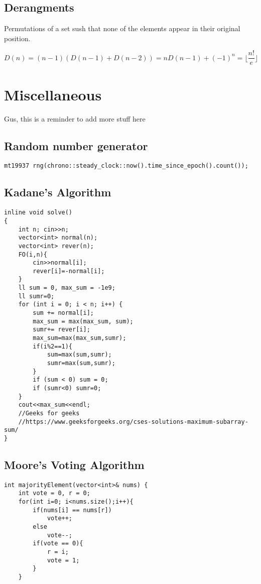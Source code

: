 \documentclass[10pt]{article}
\begin{document}
\begin{multicols*}{2}
\subsection{Derangments}

Permutations of a set sush that none of the elements appear in their original position.

\[
D(n) = (n-1)(D(n-1)+D(n-2)) = nD(n-1)+(-1)^n = \lfloor \frac{n!}{e}\rfloor
\]

\section{Miscellaneous}

Gus, this is a reminder to add more stuff here

\subsection{Random number generator}

\begin{lstlisting}[style=compactcpp]
mt19937 rng(chrono::steady_clock::now().time_since_epoch().count());
\end{lstlisting}

\subsection{Kadane's Algorithm}
\begin{lstlisting}[style=compactcpp]
inline void solve()
{
    int n; cin>>n;
    vector<int> normal(n);
    vector<int> rever(n);
    FO(i,n){
        cin>>normal[i];
        rever[i]=-normal[i];
    }
    ll sum = 0, max_sum = -1e9;
    ll sumr=0;
    for (int i = 0; i < n; i++) {
        sum += normal[i];
        max_sum = max(max_sum, sum);
        sumr+= rever[i];
        max_sum=max(max_sum,sumr);
        if(i%2==1){
            sum=max(sum,sumr);
            sumr=max(sum,sumr);
        }
        if (sum < 0) sum = 0;
        if (sumr<0) sumr=0;
    }
    cout<<max_sum<<endl;
    //Geeks for geeks
    //https://www.geeksforgeeks.org/cses-solutions-maximum-subarray-sum/
}
\end{lstlisting}

\subsection{Moore's Voting Algorithm}

\begin{lstlisting}[style=compactcpp]
int majorityElement(vector<int>& nums) {
    int vote = 0, r = 0;
    for(int i=0; i<nums.size();i++){
        if(nums[i] == nums[r])
            vote++;
        else
            vote--;
        if(vote == 0){
            r = i;
            vote = 1;
        } 
    }


\end{lstlisting}
\end{multicols*}
\end{document}
